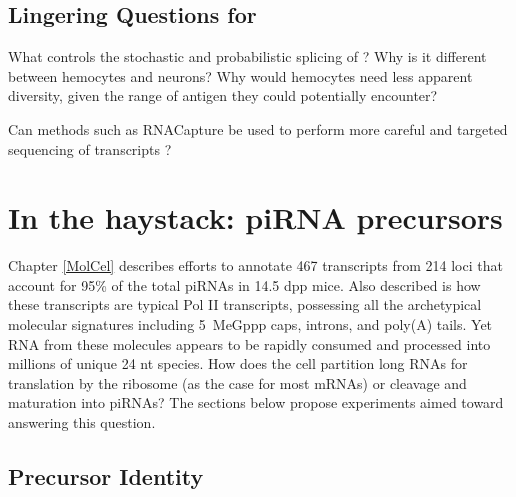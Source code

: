   \subsection{Lingering Questions for \dscam{}}
    \label{Disc:sec:Dscam}

    What controls the stochastic and probabilistic splicing of \dscam{}? Why is it different between hemocytes and neurons? Why would hemocytes need less apparent diversity, given the range of antigen they could potentially encounter?

    Can methods such as RNACapture be used to perform more careful and targeted sequencing of \dscam{} transcripts \citep{Mercer2014}?

\section{In the haystack: piRNA precursors}
  \label{Disc:sec:piRNA precursors}

  Chapter \ref{MolCel} describes efforts to annotate 467 transcripts from 214 loci that account for 95\% of the total piRNAs in 14.5 dpp mice. Also described is how these transcripts are typical Pol II transcripts, possessing all the archetypical molecular signatures including 5\textprime~MeGppp caps, introns, and poly(A) tails. Yet RNA from these molecules appears to be rapidly consumed and processed into millions of unique 24 nt species. How does the cell partition long RNAs for translation by the ribosome (as the case for most mRNAs) or cleavage and maturation into piRNAs? The sections below propose experiments aimed toward answering this question.

  \subsection{Precursor Identity}
    \label{Disc:subsec:How are precursors generated}


